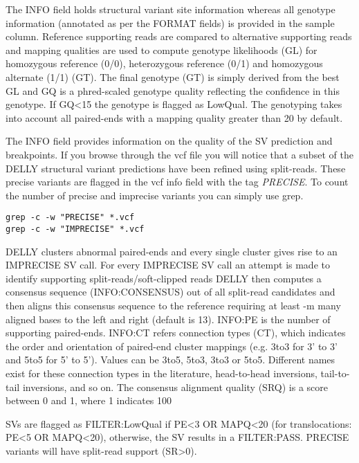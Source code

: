 \begin{note}

The INFO field holds structural variant site information whereas all genotype information (annotated as per the FORMAT fields) is provided in the sample column. Reference supporting reads are compared to alternative supporting reads and mapping qualities are used to compute genotype likelihoods (GL) for homozygous reference (0/0), heterozygous reference (0/1) and homozygous alternate (1/1) (GT). The final genotype (GT) is simply derived from the best GL and GQ is a phred-scaled genotype quality reflecting the confidence in this genotype. If GQ\textless15 the genotype is flagged as LowQual. The genotyping takes into account all paired-ends with a mapping quality greater than 20 by default. 

The INFO field provides information on the quality of the SV prediction and breakpoints. If you browse through the vcf file you will notice that a subset of the DELLY structural variant predictions have been refined using split-reads. These precise variants are flagged in the vcf info field with the tag \emph{PRECISE}. To count the number of precise and imprecise variants you can simply use grep.

\end{note}

\begin{steps}
\begin{lstlisting}
grep -c -w "PRECISE" *.vcf
grep -c -w "IMPRECISE" *.vcf
\end{lstlisting}
\end{steps}


\begin{information}
DELLY clusters abnormal paired-ends and every single cluster gives rise to an IMPRECISE SV call. For every IMPRECISE SV call an attempt is made to identify supporting split-reads/soft-clipped reads DELLY then computes a consensus sequence (INFO:CONSENSUS) out of all split-read candidates and then aligns this consensus sequence to the reference requiring at least -m many aligned bases to the left and right (default is 13). INFO:PE is the number of supporting paired-ends. INFO:CT refers connection types (CT), which indicates the order and orientation of paired-end cluster mappings (e.g. 3to3 for 3' to 3' and 5to5 for 5' to 5'). Values can be 3to5, 5to3, 3to3 or 5to5. Different names exist for these connection types in the literature, head-to-head inversions, tail-to-tail inversions, and so on. The consensus alignment quality (SRQ) is a score between 0 and 1, where 1 indicates 100%

SVs are flagged as FILTER:LowQual if PE\textless3 OR MAPQ\textless20 (for translocations: PE\textless5 OR MAPQ\textless20), otherwise, the SV results in a FILTER:PASS. PRECISE variants will have split-read support (SR\textgreater0).

\end{information}

